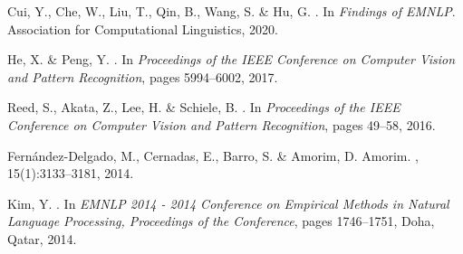 \documentclass[review]{cvpr}
\begin{document}
{\begin{thebibliography}{10}
Cui, Y., Che, W., Liu, T., Qin, B., Wang, S. \&  Hu, G.
.
\newblock In {\em Findings of EMNLP}. Association for Computational
  Linguistics, 2020.


He, X. \&  Peng, Y.
.
\newblock In {\em Proceedings of the IEEE Conference on Computer Vision and
  Pattern Recognition}, pages 5994--6002, 2017.


Reed, S., Akata, Z., Lee, H. \&  Schiele, B.
.
\newblock In {\em Proceedings of the IEEE Conference on Computer Vision and
  Pattern Recognition}, pages 49--58, 2016.


Fern{\'{a}}ndez-Delgado, M., Cernadas, E., Barro, S. \&  Amorim, D.
  Amorim.
, 15(1):3133--3181,
  2014.



Kim, Y.
.
\newblock In {\em EMNLP 2014 - 2014 Conference on Empirical Methods in Natural
  Language Processing, Proceedings of the Conference}, pages 1746--1751, Doha,
  Qatar, 2014.



\end{thebibliography}
}
\end{document}
